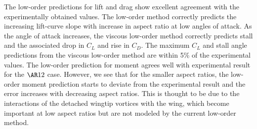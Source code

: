 The low-order predictions for lift and drag show excellent agreement with the experimentally obtained values.
The low-order method correctly predicts the increasing lift-curve slope with increase in aspect ratio at low angles of attack.
As the angle of attack increases, the viscous low-order method correctly predicts stall and the associated drop in $C_L$ and rise in $C_D$.
The maximum $C_L$ and stall angle predictions from the viscous low-order method are within 5\% of the experimental values.
The low-order prediction for moment agrees well with experimental result for the $\ar 12$ case.
However, we see that for the smaller aspect ratios, the low-order moment prediction starts to deviate from the experimental result and the error increases with decreasing aspect ratios. This is thought to be due to the interactions of the detached wingtip vortices with the wing, which become important at low aspect ratios but are not modeled by the current low-order method.
